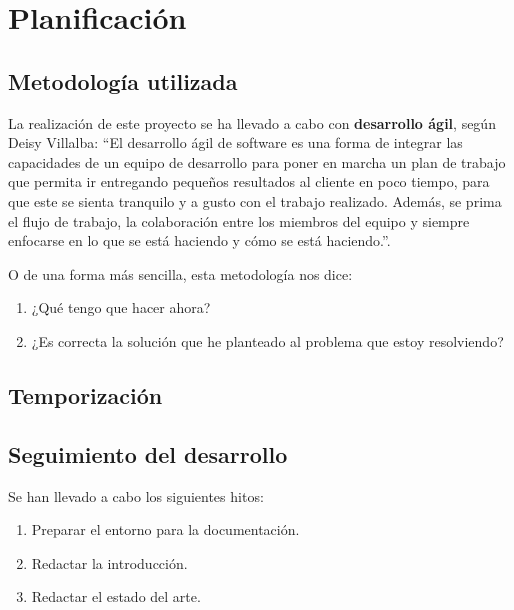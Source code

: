 \chapter{Planificación}

\section{Metodología utilizada}
La realización de este proyecto se ha llevado a cabo con \textbf{desarrollo ágil}, según Deisy Villalba: ``El desarrollo ágil de software es una forma de integrar las capacidades de un equipo de desarrollo para poner en marcha un plan de trabajo que permita ir entregando pequeños resultados al cliente en poco tiempo, para que este se sienta tranquilo y a gusto con el trabajo realizado. Además, se prima el flujo de trabajo, la colaboración entre los miembros del equipo y siempre enfocarse en lo que se está haciendo y cómo se está haciendo.''\cite{desarrollo-agil}.

O de una forma más sencilla, esta metodología nos dice:
\begin{enumerate}
    \item ¿Qué tengo que hacer ahora?
    \item ¿Es correcta la solución que he planteado al problema que estoy resolviendo?
\end{enumerate}

\section{Temporización}

\section{Seguimiento del desarrollo}

Se han llevado a cabo los siguientes hitos:
\begin{enumerate}
    \item Preparar el entorno para la documentación.
    \item Redactar la introducción.
    \item Redactar el estado del arte.
\end{enumerate}